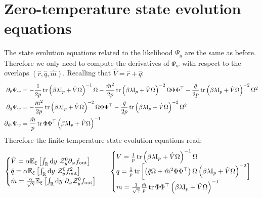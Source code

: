 \documentclass[11pt]{article}
\numberwithin{equation}{section}
\begin{document}
\section{Zero-temperature state evolution equations}
The state evolution equations related to the likelihood $\Psi_{y}$ are the same as before. Therefore we only need to compute the derivatives of $\Psi_{w}$ with respect to the overlaps $(\hat{r},\hat{q},\hat{m})$. Recalling that $\hat{V} = \hat{r}+\hat{q}$:
\begin{align}
	\partial_{\hat{r}}\Psi_{w} &= -\frac{1}{2p}\tr\left(\beta\lambda\text{I}_{p}+\hat{V}\Omega\right)^{-1}\Omega-\frac{\hat{m}^{2}}{2p}\tr\left(\beta\lambda\text{I}_{p}+\hat{V}\Omega\right)^{-2}\Omega\Phi\Phi^{\top}-\frac{\hat{q}}{2p}\tr\left(\beta\lambda\text{I}_{p}+\hat{V}\Omega\right)^{-2}\Omega^2\notag\\
\partial_{\hat{q}}\Psi_{w} &= -\frac{\hat{m}^{2}}{2p}\tr\left(\beta\lambda\text{I}_{p}+\hat{V}\Omega\right)^{-2}\Omega\Phi\Phi^{\top}-\frac{\hat{q}}{2p}\tr\left(\beta\lambda\text{I}_{p}+\hat{V}\Omega\right)^{-2}\Omega^2\\
\partial_{\hat{m}}\Psi_{w} &= \frac{\hat{m}}{p}\tr \Phi\Phi^{\top}\left(\beta\lambda\text{I}_{p}+\hat{V}\Omega\right)^{-1}
\end{align}
Therefore the finite temperature state evolution equations read:
\begin{align}
	\begin{cases}
		\hat{V} = \alpha \mathbb{E}_{\xi}\left[\int_{\mathbb{R}}\text{d} y~\mathcal{Z}^{0}_{y} \partial_{\omega}f_{\text{out}}\right]\\
		\hat{q} = \alpha \mathbb{E}_{\xi}\left[\int_{\mathbb{R}}\text{d} y~\mathcal{Z}^{0}_{y}f_{\text{out}}^2 \right]\\
		\hat{m} = \frac{\alpha}{\sqrt{\gamma}} \mathbb{E}_{\xi}\left[\int_{\mathbb{R}}\text{d} y~\partial_{\omega}\mathcal{Z}^{0}_{y}f_{\text{out}}\right]
	\end{cases} && 
	\begin{cases}
		V =  \frac{1}{p}\tr\left(\beta\lambda\text{I}_{p}+\hat{V}\Omega\right)^{-1}\Omega\\
		q = \frac{1}{p}\tr\left[\left(\hat{q}\Omega+\hat{m}^{2}\Phi\Phi^{\top}\right)\Omega\left(\beta\lambda\text{I}_{p}+\hat{V}\Omega\right)^{-2}\right]\\
		m= \frac{1}{\sqrt{\gamma}}\frac{\hat{m}}{p}\tr \Phi\Phi^{\top}\left(\beta\lambda\text{I}_{p}+\hat{V}\Omega\right)^{-1}
	\end{cases}
\end{align}
\end{document}
